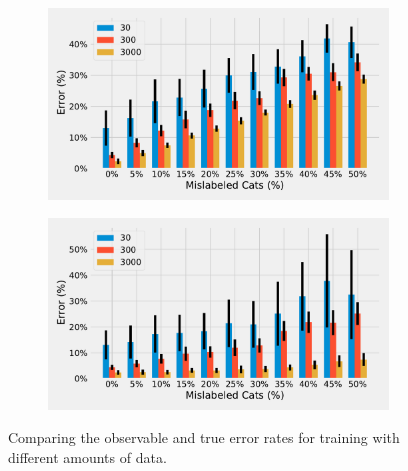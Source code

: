 \documentclass[a4paper,11pt]{scrartcl}
\theoremstyle{definition}
\begin{document}
\begin{figure}[!h]%
	\centering
\begin{subfigure}[t]{0.49\textwidth}
\includegraphics[width=0.99\textwidth]{Plots_1/ObservableTest_extreme_comparison_noTitle.pdf}
\end{subfigure}
\begin{subfigure}[t]{0.49\textwidth}
\includegraphics[width=0.99\textwidth]{Plots_1/TrueTest_extreme_comparison_noTitle.pdf}
\end{subfigure}
\caption[Error development for different training sizes]{Comparing the observable and true error rates for training with different amounts of data.}
\label{fig:development_30_300_3000}
\end{figure}
\end{document}
